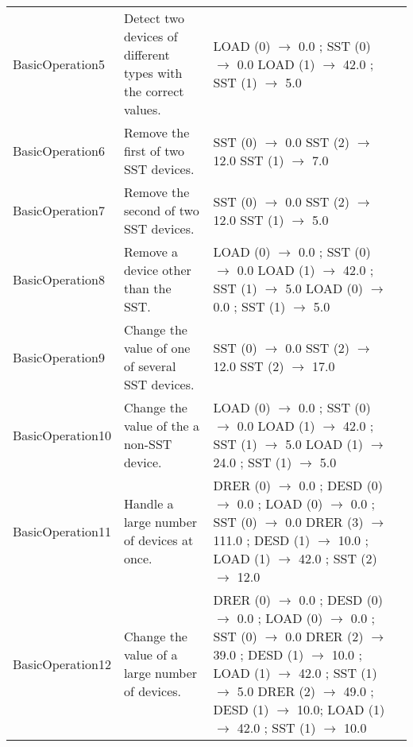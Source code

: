 \documentclass{article}
\begin{document}
\begin{center}
\begin{footnotesize}
\begin{longtable}{|p{3cm}|p{4cm}|p{10cm}|c|}
    BasicOperation5 & Detect two devices of different types with the correct values. & LOAD (0) $\rightarrow$ 0.0 ; SST (0) $\rightarrow$ 0.0 \newline LOAD (1) $\rightarrow$ 42.0 ; SST (1) $\rightarrow$ 5.0 & \\
    BasicOperation6 & Remove the first of two SST devices. & SST (0) $\rightarrow$ 0.0 \newline SST (2) $\rightarrow$ 12.0 \newline SST (1) $\rightarrow$ 7.0 & \\
    BasicOperation7 & Remove the second of two SST devices. & SST (0) $\rightarrow$ 0.0 \newline SST (2) $\rightarrow$ 12.0 \newline SST (1) $\rightarrow$ 5.0 & \\
    BasicOperation8 & Remove a device other than the SST. & LOAD (0) $\rightarrow$ 0.0 ; SST (0) $\rightarrow$ 0.0 \newline LOAD (1) $\rightarrow$ 42.0 ; SST (1) $\rightarrow$ 5.0 \newline LOAD (0) $\rightarrow$ 0.0 ; SST (1) $\rightarrow$ 5.0 & \\
    BasicOperation9 & Change the value of one of several SST devices. & SST (0) $\rightarrow$ 0.0 \newline SST (2) $\rightarrow$ 12.0 \newline SST (2) $\rightarrow$ 17.0 & \\
    BasicOperation10 & Change the value of the a non-SST device. & LOAD (0) $\rightarrow$ 0.0 ; SST (0) $\rightarrow$ 0.0 \newline LOAD (1) $\rightarrow$ 42.0 ; SST (1) $\rightarrow$ 5.0 \newline LOAD (1) $\rightarrow$ 24.0 ; SST (1) $\rightarrow$ 5.0 & \\
    BasicOperation11 & Handle a large number of devices at once. & DRER (0) $\rightarrow$ 0.0 ; DESD (0) $\rightarrow$ 0.0 ; LOAD (0) $\rightarrow$ 0.0 ; SST (0) $\rightarrow$ 0.0 \newline DRER (3) $\rightarrow$ 111.0 ; DESD (1) $\rightarrow$ 10.0 ; LOAD (1) $\rightarrow$ 42.0 ; SST (2) $\rightarrow$ 12.0 & \\
    BasicOperation12 & Change the value of a large number of devices. & DRER (0) $\rightarrow$ 0.0 ; DESD (0) $\rightarrow$ 0.0 ; LOAD (0) $\rightarrow$ 0.0 ; SST (0) $\rightarrow$ 0.0 \newline DRER (2) $\rightarrow$ 39.0 ; DESD (1) $\rightarrow$ 10.0 ; LOAD (1) $\rightarrow$ 42.0 ; SST (1) $\rightarrow$ 5.0 \newline DRER (2) $\rightarrow$ 49.0 ; DESD (1) $\rightarrow$ 10.0; LOAD (1) $\rightarrow$ 42.0 ; SST (1) $\rightarrow$ 10.0 & \\

\end{longtable}
\end{footnotesize}
\end{center}
\end{document}

